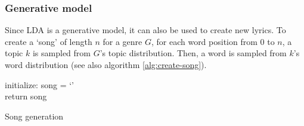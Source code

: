 \subsubsection{Generative model}
Since LDA is a generative model, it can also be used to create new lyrics. To create a `song' of length $n$ for a genre $G$, for each word position from $0$ to $n$, a topic $k$ is sampled from $G$'s topic distribution. Then, a word is sampled from $k$'s word distribution (see also algorithm \ref{alg:create-song}). \\
\begin{mdframed}
\begin{algorithm}[H]\label{alg:create-song}
 initialize: song = `' \\
 return song
 \caption{Song generation}
\end{algorithm}
\end{mdframed}


